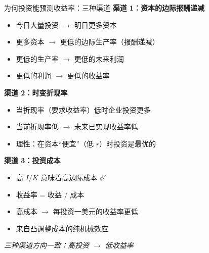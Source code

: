 \documentclass{beamer}
\begin{document}
\begin{frame}{为何投资能预测收益率：三种渠道}
    \textbf{渠道 1：资本的边际报酬递减}
    \begin{itemize}
        \item 今日大量投资 $\rightarrow$ 明日更多资本
        \item 更多资本 $\rightarrow$ 更低的边际生产率（报酬递减）
        \item 更低的生产率 $\rightarrow$ 更低的未来利润
        \item 更低的利润 $\rightarrow$ 更低的收益率
    \end{itemize}

    \vspace{0.2cm}
    \textbf{渠道 2：时变折现率}
    \begin{itemize}
        \item 当折现率（要求收益率）低时企业投资更多
        \item 当前折现率低 $\rightarrow$ 未来已实现收益率低
        \item 理性：在资本“便宜”（低 $r$）时投资是最优的
    \end{itemize}

    \vspace{0.2cm}
    \textbf{渠道 3：投资成本}
    \begin{itemize}
        \item 高 $I/K$ 意味着高边际成本 $\phi'$
        \item 收益率 = 收益 / 成本
        \item 高成本 $\rightarrow$ 每投资一美元的收益率更低
        \item 来自凸调整成本的纯机械效应
    \end{itemize}

    \vspace{0.2cm}
    \textit{三种渠道方向一致：高投资 $\rightarrow$ 低收益率}
\end{frame}
\end{document}

